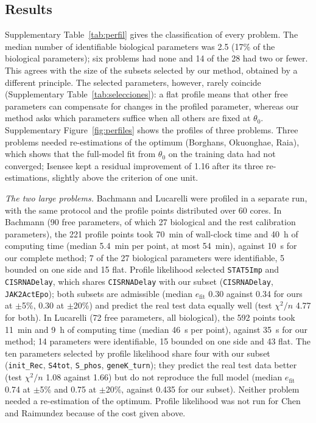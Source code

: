 \subsection*{Results}
Supplementary Table~\ref{tab:perfil} gives the classification of every problem. The median number of identifiable biological parameters was 2.5 (17\% of the biological parameters); six problems had none and 14 of the 28 had two or fewer. This agrees with the size of the subsets selected by our method, obtained by a different principle. The selected parameters, however, rarely coincide (Supplementary Table~\ref{tab:selecciones}): a flat profile means that other free parameters can compensate for changes in the profiled parameter, whereas our method asks which parameters suffice when all others are fixed at $\theta_0$. Supplementary Figure~\ref{fig:perfiles} shows the profiles of three problems. Three problems needed re-estimations of the optimum (Borghans, Okuonghae, Raia), which shows that the full-model fit from $\theta_0$ on the training data had not converged; Isensee kept a residual improvement of 1.16 after its three re-estimations, slightly above the criterion of one unit.

\emph{The two large problems.} Bachmann and Lucarelli were profiled in a separate run, with the same protocol and the profile points distributed over 60 cores. In Bachmann (90 free parameters, of which 27 biological and the rest calibration parameters), the 221 profile points took 70~min of wall-clock time and 40~h of computing time (median 5.4~min per point, at most 54~min), against 10~s for our complete method; 7 of the 27 biological parameters were identifiable, 5 bounded on one side and 15 flat. Profile likelihood selected \texttt{STAT5Imp} and \texttt{CISRNADelay}, which shares \texttt{CISRNADelay} with our subset (\texttt{CISRNADelay}, \texttt{JAK2ActEpo}); both subsets are admissible (median $e_{\mathrm{fit}}$ 0.30 against 0.34 for ours at $\pm$5\%, 0.30 at $\pm$20\%) and predict the real test data equally well (test $\chi^2/n$ 4.77 for both). In Lucarelli (72 free parameters, all biological), the 592 points took 11~min and 9~h of computing time (median 46~s per point), against 35~s for our method; 14 parameters were identifiable, 15 bounded on one side and 43 flat. The ten parameters selected by profile likelihood share four with our subset (\texttt{init\_Rec}, \texttt{S4tot}, \texttt{S\_phos}, \texttt{geneK\_turn}); they predict the real test data better (test $\chi^2/n$ 1.08 against 1.66) but do not reproduce the full model (median $e_{\mathrm{fit}}$ 0.74 at $\pm$5\% and 0.75 at $\pm$20\%, against 0.435 for our subset). Neither problem needed a re-estimation of the optimum. Profile likelihood was not run for Chen and Raimundez because of the cost given above.

